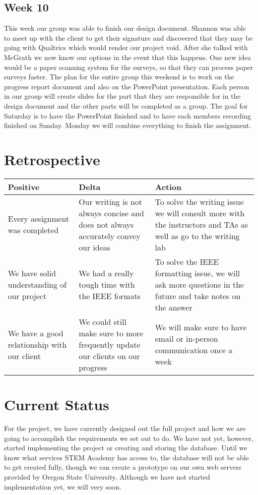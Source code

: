 \documentclass[letterpaper,10pt,serif, draftclsnofoot,onecolumn, compsoc, titlepage]{IEEEtran}
\begin{document}
\subsection{Week 10}
This week our group was able to finish our design document. Shannon was able to meet up with the client to get their signature and discovered that they may be going with Qualtrics which would render our project void. After she talked with McGrath we now know our options in the event that this happens. One new idea would be a paper scanning system for the surveys, so that they can process paper surveys faster. The plan for the entire group this weekend is to work on the progress report document and also on the PowerPoint presentation. Each person in our group will create slides for the part that they are responsible for in the design document and the other parts will be completed as a group. The goal for Saturday is to have the PowerPoint finished and to have each members recording finished on Sunday. Monday we will combine everything to finish the assignment. 

\section{Retrospective}
\begin{center}
    \begin{tabular}{ | p{5cm} | p{5cm} | p{5cm} |}
    \hline
     Positive & Delta & Action \\ \hline
  	Every assignment was completed & Our writing is not always concise and does not always accurately convey our ideas & To solve the writing issue we will consult more with the instructors and TAs as well as go to the writing lab \\\hline
	We have solid understanding of our project & We had a really tough time with the IEEE formats & To solve the IEEE formatting issue, we will ask more questions in the future and take notes on the answer \\ \hline
	We have a good relationship with our client & We could still make sure to more frequently update our clients on our progress & We will make sure to have email or in-person communication once a week \\ \hline
    \end{tabular}
\end{center}

\section{Current Status}
For the project, we have currently designed out the full project and how we are going to accomplish the requirements we set out to do.
We have not yet, however, started implementing the project or creating and storing the database.
Until we know what services STEM Academy has access to, the database will not be able to get created fully, though we can create a prototype on our own web servers provided by Oregon State University.
Although we have not started implementation yet, we will very soon.
\end{document}
